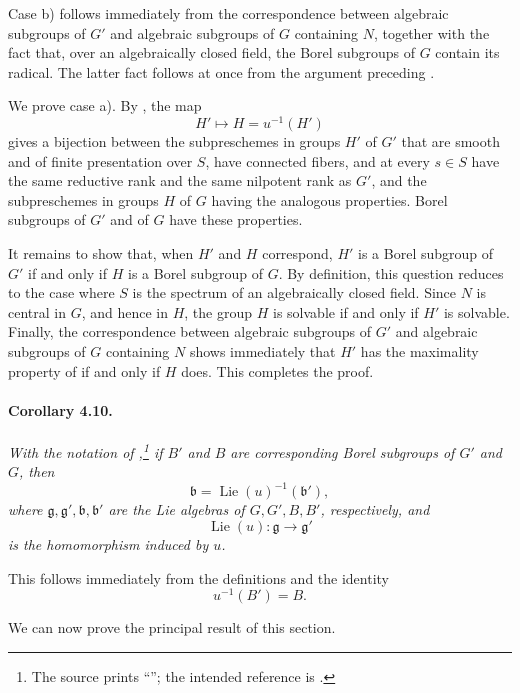 Case \textup{b)} follows immediately from the correspondence between
algebraic subgroups of \(G'\) and algebraic subgroups of \(G\)
containing \(N\), together with the fact that, over an algebraically
closed field, the Borel subgroups of \(G\) contain its radical. The
latter fact follows at once from the argument preceding .

We prove case \textup{a)}. By , the map
\[
  H'\longmapsto H=u^{-1}(H')
\]
gives a bijection between the subpreschemes in groups \(H'\) of
\(G'\) that are smooth and of finite presentation over \(S\), have
connected fibers, and at every \(s\in S\) have the same reductive
rank and the same nilpotent rank as \(G'\), and the subpreschemes
in groups \(H\) of \(G\) having the analogous properties. Borel
subgroups of \(G'\) and of \(G\) have these properties.

It remains to show that, when \(H'\) and \(H\) correspond, \(H'\)
is a Borel subgroup of \(G'\) if and only if \(H\) is a Borel
subgroup of \(G\). By definition, this question reduces to the case
where \(S\) is the spectrum of an algebraically closed field. Since
\(N\) is central in \(G\), and hence in \(H\), the group \(H\) is
solvable if and only if \(H'\) is solvable. Finally, the
correspondence between algebraic subgroups of \(G'\) and algebraic
subgroups of \(G\) containing \(N\) shows immediately that \(H'\)
has the maximality property of  if and only if \(H\)
does. This completes the proof.

\paragraph{\textbf{Corollary 4.10.}}
{\itshape With the notation of ,\footnote{The source prints
``''; the intended reference is .} if \(B'\) and \(B\) are
corresponding Borel subgroups of \(G'\) and \(G\), then
\[
  \mathfrak b=\operatorname{Lie}(u)^{-1}(\mathfrak b'),
\]
where \(\mathfrak g,\mathfrak g',\mathfrak b,\mathfrak b'\) are
the Lie algebras of \(G,G',B,B'\), respectively, and
\[
  \operatorname{Lie}(u)\colon\mathfrak g\longrightarrow\mathfrak g'
\]
is the homomorphism induced by \(u\).}

This follows immediately from the definitions and the identity
\[
  u^{-1}(B')=B.
\]

We can now prove the principal result of this section.

